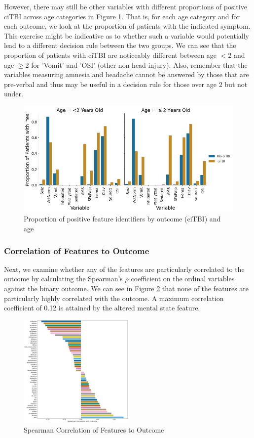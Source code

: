 \documentclass[11pt, letterpaper]{amsart}
\let\Oldsubsubsection\subsubsection
\renewcommand{\subsubsection}{\FloatBarrier\Oldsubsubsection}
\begin{document}
However, there may still be other variables with different proportions of positive ciTBI across age categories in Figure \ref{fig:age_covariate}. That is, for each age category and for each outcome, we look at the proportion of patients with the indicated symptom. This exercise might be indicative as to whether such a variable would potentially lead to a different decision rule between the two groups. We can see that the proportion of patients with ciTBI are noticeably different between age $<2$ and age $\geq 2$ for 'Vomit' and 'OSI' (other non-head injury). Also, remember that the variables measuring amnesia and headache cannot be answered by those that are pre-verbal and thus may be useful in a decision rule for those over age 2 but not under.
\begin{figure}
	\centering
	\includegraphics[width=\textwidth]{covariate_by_age.png}
	\caption{Proportion of positive feature identifiers by outcome (ciTBI) and age}\label{fig:age_covariate}
\end{figure}


\subsubsection{Correlation of Features to Outcome}

Next, we examine whether any of the features are particularly correlated to the outcome by calculating the Spearman's $\rho$ coefficient on the ordinal variables against the binary outcome. We can see in Figure \ref{fig:spearman_corr_to_outcome} that none of the features are particularly highly correlated with the outcome. A maximum correlation coefficient of 0.12 is attained by the altered mental state feature.
\begin{figure}
	\centering
	\includegraphics[width=0.5\textwidth]{spearman_corr_to_outcome.png}
	\caption{Spearman Correlation of Features to Outcome}\label{fig:spearman_corr_to_outcome}
\end{figure}
\end{document}
